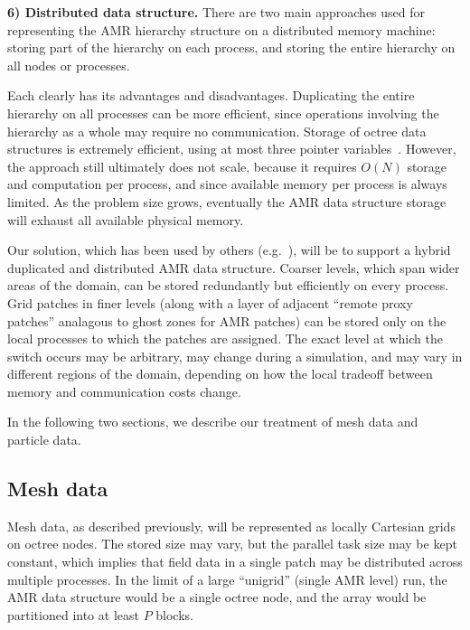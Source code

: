 \documentclass[10pt,twocolumn]{article}
\begin{document}

\textbf{6) Distributed data structure.} There are two main approaches
used for representing the AMR hierarchy structure on a distributed
memory machine: storing part of the hierarchy on each process, and
storing the entire hierarchy on all nodes or processes.

Each clearly has its advantages and disadvantages.  Duplicating the
entire hierarchy on all processes can be more efficient, since
operations involving the hierarchy as a whole may require no
communication.  Storage of octree data structures is extremely
efficient, using at most three pointer variables~\cite{FrPe02}.  However,
the approach still ultimately does not scale, because it requires
$O(N)$ storage and computation per process, and since available memory
per process is always limited.  As the problem size grows, eventually
the AMR data structure storage will exhaust all available physical
memory.

Our solution, which has been used by others
(e.g.~\cite{@@@hybrid-storage}), will be to support a hybrid
duplicated and distributed AMR data structure.  Coarser levels, which
span wider areas of the domain, can be stored redundantly but
efficiently on every process.  Grid patches in finer levels (along
with a layer of adjacent ``remote proxy patches'' analagous to ghost
zones for AMR patches) can be stored only on the local processes to
which the patches are assigned.  The exact level at which the switch
occurs may be arbitrary, may change during a simulation, and may vary
in different regions of the domain, depending on how the local tradeoff
between memory and communication costs change.

In the following two sections, we describe our treatment of mesh data
and particle data.

\subsection{Mesh data} \label{ss:design-fields}

Mesh data, as described previously, will be represented as locally
Cartesian grids on octree nodes.  The stored size may vary, but the
parallel task size may be kept constant, which implies that field data
in a single patch may be distributed across multiple processes.  In
the limit of a large ``unigrid'' (single AMR level) run, the AMR data
structure would be a single octree node, and the array would be
partitioned into at least $P$ blocks.
\end{document}

